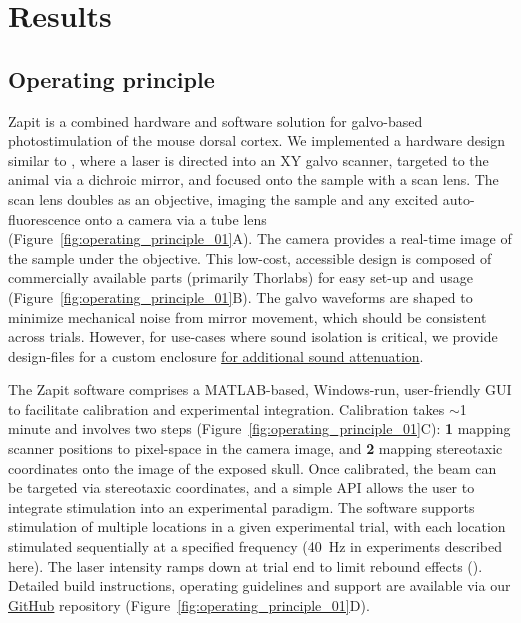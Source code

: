 \section{Results}

\subsection{Operating principle}
Zapit is a combined hardware and software solution for galvo-based photostimulation of the mouse dorsal cortex.
We implemented a hardware design similar to \citet{Pinto2019Task-DependentRegions,Pinto2022MultipleCortex}, where a laser is directed into an XY galvo scanner, targeted to the animal via a dichroic mirror, and focused onto the sample with a scan lens.
The scan lens doubles as an objective, imaging the sample and any excited auto-fluorescence onto a camera via a tube lens (Figure~\ref{fig:operating_principle_01}A).
The camera provides a real-time image of the sample under the objective.
This low-cost, accessible design is composed of commercially available parts (primarily Thorlabs) for easy set-up and usage (Figure~\ref{fig:operating_principle_01}B).
The galvo waveforms are shaped to minimize mechanical noise from mirror movement, which should be consistent across trials.
However, for use-cases where sound isolation is critical, we provide design-files for a custom enclosure \href{https://github.com/Zapit-Optostim/zapit_CAD/tree/main}{for additional sound attenuation}.

The Zapit software comprises a MATLAB-based, Windows-run, user-friendly GUI to facilitate calibration and experimental integration.
Calibration takes $\sim$1 minute and involves two steps (Figure~\ref{fig:operating_principle_01}C):
\textbf{1} mapping scanner positions to pixel-space in the camera image, and \textbf{2} mapping stereotaxic coordinates onto the image of the exposed skull.
Once calibrated, the beam can be targeted via stereotaxic coordinates, and a simple API allows the user to integrate stimulation into an experimental paradigm.
The software supports stimulation of multiple locations in a given experimental trial, with each location stimulated sequentially at a specified frequency (40~Hz in experiments described here).
The laser intensity ramps down at trial end to limit rebound effects (\cite{Li2019SpatiotemporalCircuits}).
Detailed build instructions, operating guidelines and support are available via our \href{https://github.com/Zapit-Optostim/zapit}{GitHub} repository (Figure~\ref{fig:operating_principle_01}D).

